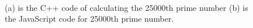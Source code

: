 \documentclass[conference]{IEEEtran}
\begin{document}
\begin{figure}[hbt!]
		\label{figure:prime}
         \centering{}
        \centering{}\\ %
    \caption{(a) is the C++ code of calculating the 25000th prime number (b) is the JavaScript code for 25000th prime number.}
\end{figure}
%
%
%
%
%
%
%
%
%
%
%
%
%
%
%
%
%
\end{document}
